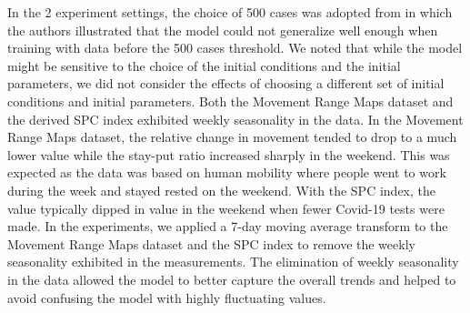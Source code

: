 In the 2 experiment settings, the choice of 500 cases was adopted from \cite{dandekarMachineLearningAidedGlobal2020a} in which the authors illustrated that the model could not generalize well enough when training with data before the 500 cases threshold.
We noted that while the model might be sensitive to the choice of the initial conditions and the initial parameters, we did not consider the effects of choosing a different set of initial conditions and initial parameters.
Both the Movement Range Maps dataset and the derived \gls{SPC} index exhibited weekly seasonality in the data.
In the Movement Range Maps dataset, the relative change in movement tended to drop to a much lower value while the stay-put ratio increased sharply in the weekend.
This was expected as the data was based on human mobility where people went to work during the week and stayed rested on the weekend.
With the \gls{SPC} index, the value typically dipped in value in the weekend when fewer Covid-19 tests were made.
In the experiments, we applied a 7-day moving average transform to the Movement Range Maps dataset and the \gls{SPC} index to remove the weekly seasonality exhibited in the measurements.
The elimination of weekly seasonality in the data allowed the model to better capture the overall trends and helped to avoid confusing the model with highly fluctuating values.